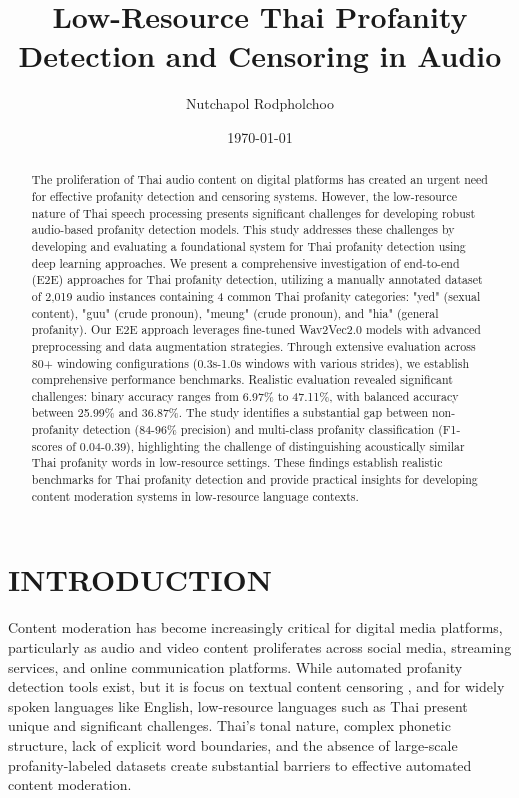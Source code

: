 \documentclass[11pt]{article}
\title{Low-Resource Thai Profanity Detection and Censoring in Audio}
\author{Nutchapol Rodpholchoo}
\date{\today}
\begin{document}
\maketitle

\begin{abstract}
The proliferation of Thai audio content on digital platforms has created an urgent need for effective profanity detection and censoring systems. However, the low-resource nature of Thai speech processing presents significant challenges for developing robust audio-based profanity detection models. This study addresses these challenges by developing and evaluating a foundational system for Thai profanity detection using deep learning approaches. We present a comprehensive investigation of end-to-end (E2E) approaches for Thai profanity detection, utilizing a manually annotated dataset of 2,019 audio instances containing 4 common Thai profanity categories: "yed" (sexual content), "guu" (crude pronoun), "meung" (crude pronoun), and "hia" (general profanity). Our E2E approach leverages fine-tuned Wav2Vec2.0 models with advanced preprocessing and data augmentation strategies. Through extensive evaluation across 80+ windowing configurations (0.3s-1.0s windows with various strides), we establish comprehensive performance benchmarks. Realistic evaluation revealed significant challenges: binary accuracy ranges from 6.97\% to 47.11\%, with balanced accuracy between 25.99\% and 36.87\%. The study identifies a substantial gap between non-profanity detection (84-96\% precision) and multi-class profanity classification (F1-scores of 0.04-0.39), highlighting the challenge of distinguishing acoustically similar Thai profanity words in low-resource settings. These findings establish realistic benchmarks for Thai profanity detection and provide practical insights for developing content moderation systems in low-resource language contexts.
\end{abstract}

\section{INTRODUCTION}
Content moderation has become increasingly critical for digital media platforms, particularly 
as audio and video content proliferates across social media, streaming services, and online 
communication platforms. While automated profanity detection tools exist, but it is focus on textual content censoring \cite{waseem2017understanding},
and for widely spoken languages like English, low-resource languages such as Thai present unique and significant 
challenges. Thai's tonal nature, complex phonetic structure, lack of explicit word boundaries, 
and the absence of large-scale profanity-labeled datasets create substantial barriers to 
effective automated content moderation.
\end{document}
